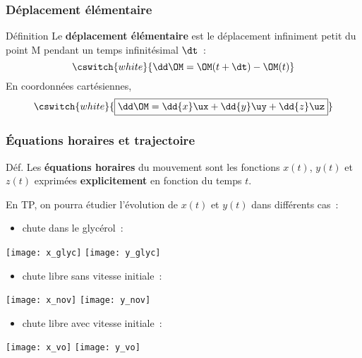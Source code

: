 \documentclass[../main/main.tex]{subfiles}
\begin{document}
\subsubsection{Déplacement élémentaire}
\begin{bdefi}{Définition}
    Le \textbf{déplacement élémentaire} est le déplacement infiniment petit du
    point M pendant un temps infinitésimal $\dt$~:
    \[\cswitch{white}{\dd\OM = \OM(t+\dt)-\OM(t)}\]
    En coordonnées cartésiennes,
    \[\cswitch{white}{\boxed{\dd\OM = \dd{x}\ux + \dd{y}\uy + \dd{z}\uz}}\]
\end{bdefi}

\subsubsection{Équations horaires et trajectoire}
\begin{rdefi}{Déf.}
    Les \textbf{équations horaires} du mouvement sont les fonctions $x(t)$,
    $y(t)$ et $z(t)$ exprimées \textbf{explicitement} en fonction du temps $t$.
\end{rdefi}

En TP, on pourra étudier l'évolution de $x(t)$ et $y(t)$ dans différents cas~:
\bigbreak

\begin{minipage}{0.31\linewidth}
    \begin{itemize}
        \item chute dans le glycérol~:
    \end{itemize}
    \begin{center}
        \texttt{[image: x\_glyc]}
        \texttt{[image: y\_glyc]}
    \end{center}
\end{minipage}
\hfill
\begin{minipage}{0.31\linewidth}
    \begin{itemize}
        \item chute libre sans vitesse initiale~:
    \end{itemize}
    \begin{center}
        \texttt{[image: x\_nov]}
        \texttt{[image: y\_nov]}
    \end{center}
\end{minipage}
\hfill
\begin{minipage}{0.31\linewidth}
    \begin{itemize}
        \item chute libre avec vitesse initiale~:
    \end{itemize}
    \begin{center}
        \texttt{[image: x\_vo]}
        \texttt{[image: y\_vo]}
    \end{center}
\end{minipage}
\end{document}
